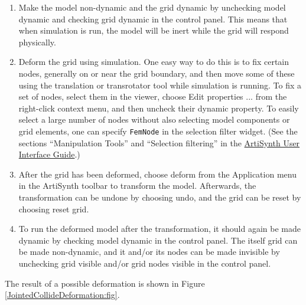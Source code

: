 \begin{enumerate}

\item Make the model non-dynamic and the grid dynamic by unchecking
{\sf model dynamic} and checking {\sf grid dynamic} in the control
panel. This means that when simulation is run, the model will be inert
while the grid will respond physically.

\item Deform the grid using simulation. One easy way to do this is to
fix certain nodes, generally on or near the grid boundary, and then
move some of these using the translation or transrotator
tool while simulation is running. To fix a set of nodes, select
them in the viewer, choose {\sf Edit properties ...} from the
right-click context menu, and then uncheck their {\sf dynamic} property.
To easily select a large number of nodes without also selecting
model components or grid elements, one can specify {\tt FemNode}
in the selection filter widget. (See the sections
``Manipulation Tools'' and ``Selection filtering'' in the
\href{\artisynthDocBase/html/uiguide/uiguide.html}{ArtiSynth User Interface Guide}.)

\item After the grid has been deformed, choose {\sf deform} from the
{\sf Application} menu in the ArtiSynth toolbar to transform the model.
Afterwards, the transformation can be undone by choosing {\sf undo},
and the grid can be reset by choosing {\sf reset grid}.

\item To run the deformed model after the transformation, it should
again be made dynamic by checking {\sf model dynamic} in the control
panel.  The itself grid can be made non-dynamic, and it and/or its
nodes can be made invisible by unchecking {\sf grid visible} and/or
{\sf grid nodes visible} in the control panel.

\end{enumerate}

The result of a possible deformation is shown in Figure
\ref{JointedCollideDeformation:fig}.

